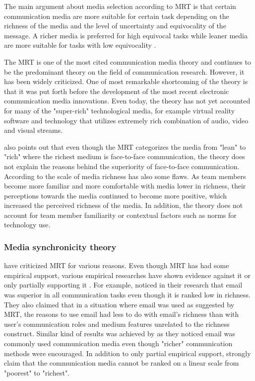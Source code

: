\documentclass[english,12pt,a4paper,pdftex]{article}
\begin{document}
The main argument about media selection according to \ac{MRT} is that certain communication media are more suitable for certain task depending on the richness of the media and the level of uncertainty and equivocality of the message. A richer media is preferred for high equivocal tasks while leaner media are more suitable for tasks with low equivocality \citep{daft1987}.

The \ac{MRT} is one of the most cited communication media theory and continues to be the predominant theory on the field of communication research. However, it has been widely criticized. One of most remarkable shortcoming of the theory is that it was put forth before the development of the most recent electronic communication media innovations. Even today, the theory has not yet accounted for many of the "super-rich" technological media, for example virtual reality software and technology that utilizes extremely rich combination of audio, video and visual streams. \citep{derosa2004}

\citet{derosa2004} also points out that even though the \ac{MRT} categorizes the media from "lean" to "rich" where the richest medium is face-to-face communication, the theory does not explain the reasons behind the superiority of face-to-face communication. According to \citet{derosa2004} the scale of media richness has also some flaws. As team members become more familiar and more comfortable with media lower in richness, their perceptions towards the media continued to become more positive, which increased the perceived richness of the media. In addition, the theory does not account for team member familiarity or contextual factors such as norms for technology use.

\subsubsection{Media synchronicity theory}
\label{sec:media_synchronicity_theory}

\citet{dennis1999} have criticized \ac{MRT} for various reasons. Even though \ac{MRT} has had some empirical support, various empirical researches have shown evidence against it or only partially supporting it \citep{dennis1998} \citep{elshinnawy1997}. For example, \citet{elshinnawy1997} noticed in their research that email was superior in all communication tasks even though it is ranked low in richness. They also claimed that in a situation where email was used as suggested by \ac{MRT}, the reasons to use email had less to do with email's richness than with user's communication roles and medium features unrelated to the richness construct. Similar kind of results was achieved by \citet{korkala2006} as they noticed email was commonly used communication media even though "richer" communication methods were encouraged. In addition to only partial empirical support, \citet{dennis1999} strongly claim that the communication media cannot be ranked on a linear scale from "poorest" to "richest".
\end{document}
